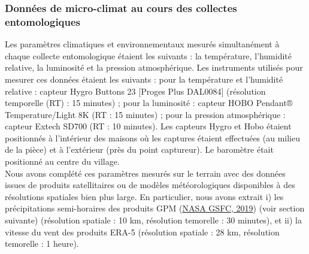 \documentclass[12pt,twoside]{reedthesis}
\begin{document}
\hypertarget{donnuxe9es-de-micro-climat-au-cours-des-collectes-entomologiques}{%
\subsubsection{Données de micro-climat au cours des collectes entomologiques}\label{donnuxe9es-de-micro-climat-au-cours-des-collectes-entomologiques}}

Les paramètres climatiques et environnementaux mesurés simultanément à chaque collecte entomologique étaient les suivants : la température, l'humidité relative, la luminosité et la pression atmosphérique. Les instruments utilisés pour mesurer ces données étaient les suivants : pour la température et l'humidité relative : capteur Hygro Buttons 23 {[}Proges Plus DAL0084{]} (résolution temporelle (RT) : 15 minutes) ; pour la luminosité : capteur HOBO Pendant® Temperature/Light 8K (RT : 15 minutes) ; pour la pression atmosphérique : capteur Extech SD700 (RT : 10 minutes). Les capteurs Hygro et Hobo étaient positionnés à l'intérieur des maisons où les captures étaient effectuées (au milieu de la pièce) et à l'extérieur (près du point captureur). Le baromètre était positionné au centre du village.\\

Nous avons complété ces paramètres mesurés sur le terrain avec des données issues de produits satellitaires ou de modèles météorologiques disponibles à des résolutions spatiales bien plus large. En particulier, nous avons extrait i) les précipitations semi-horaires des produits GPM (\protect\hyperlink{ref-precipitation_processing_system_pps_at_nasa_gsfc_gpm_2019}{NASA GSFC, 2019}) (voir section suivante) (résolution spatiale : 10 km, résolution temorelle : 30 minutes), et ii) la vitesse du vent des produits ERA-5 (résolution spatiale : 28 km, résolution temorelle : 1 heure).\\
\end{document}
